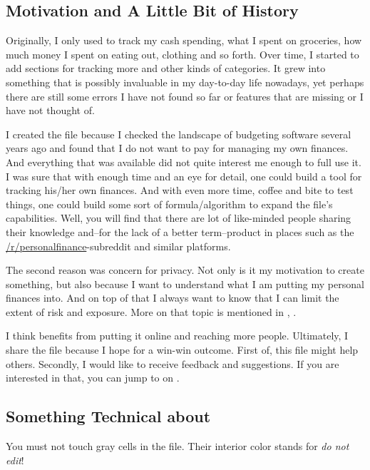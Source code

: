 \subsection{Motivation and A Little Bit of History}
\label{subsec:motivation-history}

Originally, I only used \tfn to track my cash spending, \ie what I spent on groceries, how much money I spent on eating out, clothing and so forth.
Over time, I started to add sections for tracking more and other kinds of categories.
It grew into something that is possibly invaluable in my day-to-day life nowadays, yet perhaps there are still some errors I have not found so far or features that are missing or I have not thought of.

I created the file because I checked the landscape of budgeting software several years ago and found that I do not want to pay for managing my own finances.
And everything that was available did not quite interest me enough to full use it.
I was sure that with enough time and an eye for detail, one could build a tool for tracking his/her own finances.
And with even more time, coffee and bite to test things, one could build some sort of formula/algorithm to expand the file's capabilities.
Well, you will find that there are lot of like-minded people sharing their knowledge and--for the lack of a better term--product in places such as the \href{https://reddit.com/r/personalfinance}{/r/personalfinance}-subreddit and similar platforms.

The second reason was concern for privacy.
Not only is it my motivation to create something, but also because I want to understand what I am putting my personal finances into.
And on top of that I always want to know that I can limit the extent of risk and exposure.
More on that topic is mentioned in , .

I think \tfn benefits from putting it online and reaching more people.
Ultimately, I share the file because I hope for a win-win outcome.
First of, this file might help others.
Secondly, I would like to receive feedback and suggestions.
If you are interested in that, you can jump to  on .

\subsection{Something Technical about \tfn}
\label{subsec:introduction-something-technical}

You must not touch gray cells in the file.
Their interior color stands for \emph{do not edit}!

